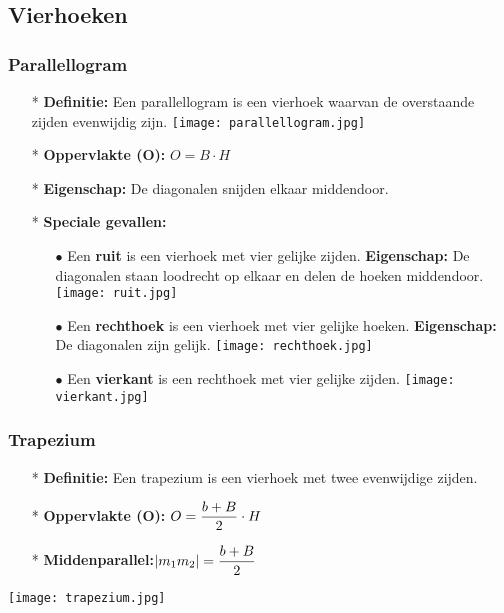 \subsection{Vierhoeken} \label{vierhoeken}
\hypertarget{vierhoeken}{}

\subsubsection{Parallellogram} \label{parallellogram}
\hypertarget{parallellogram}{}
		\begin{itemize}%
		\item[*]{\bf Definitie:} Een parallellogram is een vierhoek waarvan de 		overstaande zijden evenwijdig zijn.\newline
                \texttt{[image: parallellogram.jpg]}
		\item[*]{\bf Oppervlakte (O):} $O = B\cdot H$
		\item[*]{\bf Eigenschap:} De diagonalen snijden elkaar middendoor.
		\item[*]{\bf Speciale gevallen:}
			\begin{itemize}
			\item[$\bullet$]Een {\bf ruit} is een vierhoek met vier gelijke 			zijden.\newline
			{\bf Eigenschap:} De diagonalen staan loodrecht op elkaar en delen de 			hoeken middendoor.
                        \texttt{[image: ruit.jpg]}
			\item[$\bullet$]Een {\bf rechthoek} is een vierhoek met vier gelijke 			hoeken.\newline 
			{\bf Eigenschap:} De diagonalen zijn gelijk.\newline
                        \texttt{[image: rechthoek.jpg]}
			\item[$\bullet$]Een {\bf vierkant} is een rechthoek met vier gelijke 			zijden.\newline
                        \texttt{[image: vierkant.jpg]}
			\end{itemize}
		\end{itemize}%

\subsubsection{Trapezium} \label{trapezium}
\hypertarget{trapezium}{}
		\begin{itemize}%
		\item[*]{\bf Definitie:}
		Een trapezium is een vierhoek met twee evenwijdige zijden.
		\item[*]{\bf Oppervlakte (O):} $O=\displaystyle\frac{\displaystyle b+B}{\displaystyle 2}\cdot H$
		\item[*]{\bf Middenparallel:}$|m_1m_2|=\displaystyle\frac{\displaystyle b+B}{\displaystyle 2}$
		\end{itemize}%
                \texttt{[image: trapezium.jpg]}

